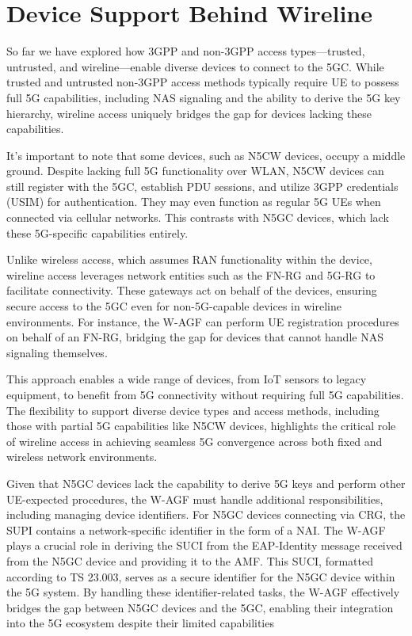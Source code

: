 \section{Device Support Behind Wireline}

So far we have explored how \ac{3GPP} and non-\ac{3GPP} access types—trusted, untrusted, and wireline—enable diverse devices to connect to the \ac{5GC}. While trusted and untrusted non-\ac{3GPP} access methods typically require \ac{UE} to possess full \ac{5G} capabilities, including \ac{NAS} signaling and the ability to derive the \ac{5G} key hierarchy, wireline access uniquely bridges the gap for devices lacking these capabilities.

It's important to note that some devices, such as \ac{N5CW} devices, occupy a middle ground. Despite lacking full \ac{5G} functionality over \ac{WLAN}, \ac{N5CW} devices can still register with the \ac{5GC}, establish PDU sessions, and utilize \ac{3GPP} credentials (\ac{USIM}) for authentication. They may even function as regular \ac{5G} \acp{UE} when connected via cellular networks. This contrasts with \ac{N5GC} devices, which lack these \ac{5G}-specific capabilities entirely.

Unlike wireless access, which assumes \ac{RAN} functionality within the device, wireline access leverages network entities such as the \ac{FN-RG} and \ac{5G-RG} to facilitate connectivity. These gateways act on behalf of the devices, ensuring secure access to the \ac{5GC} even for non-\ac{5G}-capable devices in wireline environments. For instance, the \ac{W-AGF} can perform \ac{UE} registration procedures on behalf of an \ac{FN-RG}, bridging the gap for devices that cannot handle \ac{NAS} signaling themselves.

This approach enables a wide range of devices, from \ac{IoT} sensors to legacy equipment, to benefit from \ac{5G} connectivity without requiring full \ac{5G} capabilities. The flexibility to support diverse device types and access methods, including those with partial \ac{5G} capabilities like \ac{N5CW} devices, highlights the critical role of wireline access in achieving seamless \ac{5G} convergence across both fixed and wireless network environments.

Given that \ac{N5GC} devices lack the capability to derive \ac{5G} keys and perform other \ac{UE}-expected procedures, the \ac{W-AGF} must handle additional responsibilities, including managing device identifiers. For \ac{N5GC} devices connecting via \ac{CRG}, the \ac{SUPI} contains a network-specific identifier in the form of a \ac{NAI}. The \ac{W-AGF} plays a crucial role in deriving the \ac{SUCI} from the \ac{EAP}-Identity message received from the \ac{N5GC} device and providing it to the \ac{AMF}. This \ac{SUCI}, formatted according to TS 23.003, serves as a secure identifier for the \ac{N5GC} device within the \ac{5G} system. By handling these identifier-related tasks, the \ac{W-AGF} effectively bridges the gap between \ac{N5GC} devices and the \ac{5GC}, enabling their integration into the \ac{5G} ecosystem despite their limited capabilities

